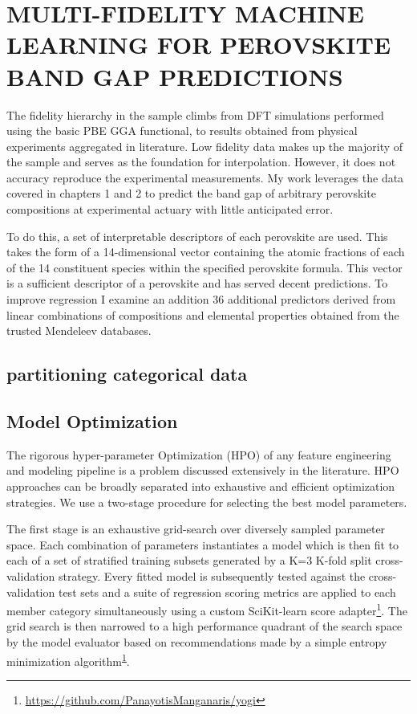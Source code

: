 \chapter{MULTI-FIDELITY MACHINE LEARNING FOR PEROVSKITE BAND GAP PREDICTIONS}
\label{sec:org6e93bf0}

The fidelity hierarchy in the sample climbs from DFT simulations performed using the basic PBE GGA functional, to results obtained from physical experiments aggregated in literature.
\autocite{almora-2020-devic-perfor,kim-2014-cdses-nanow,swanson-2017-co-sublim}
Low fidelity data makes up the majority of the sample and serves as the foundation for interpolation.
However, it does not accuracy reproduce the experimental measurements.
My work leverages the data covered in chapters 1 and 2 to predict the band gap of arbitrary perovskite compositions at experimental actuary with little anticipated error.

To do this, a set of interpretable descriptors of each perovskite are used.
This takes the form of a 14-dimensional vector containing the atomic fractions of each of the 14 constituent species within the specified perovskite formula.
This vector is a sufficient descriptor of a perovskite and has served decent predictions.
\autocite{mannodi-kanakkithodi-2022-data-driven}
To improve regression I examine an addition 36 additional predictors derived from linear combinations of compositions and elemental properties obtained from the trusted Mendeleev databases.
\autocite{mentel-2014}

\section{partitioning categorical data}
\label{sec:org1308e98}
\section{Model Optimization}
\label{sec:orgdf72fec}
The rigorous hyper-parameter Optimization (HPO) of any feature engineering and modeling pipeline is a problem discussed extensively in the literature.
HPO approaches can be broadly separated into exhaustive and efficient optimization strategies.
\autocite{yang-2020-hyper-optim}
We use a two-stage procedure for selecting the best model parameters.

The first stage is an exhaustive grid-search over diversely sampled parameter space.
Each combination of parameters instantiates a model which is then fit to each of a set of stratified training subsets generated by a K=3 K-fold split cross-validation strategy.
Every fitted model is subsequently tested against the cross-validation test sets and a suite of regression scoring metrics are applied to each member category simultaneously using a custom SciKit-learn score adapter\footnote{\url{https://github.com/PanayotisManganaris/yogi}\label{orge6282b6}}.
The grid search is then narrowed to a high performance quadrant of the search space by the model evaluator based on recommendations made by a simple entropy minimization algorithm\textsuperscript{\ref{orge6282b6}}.

